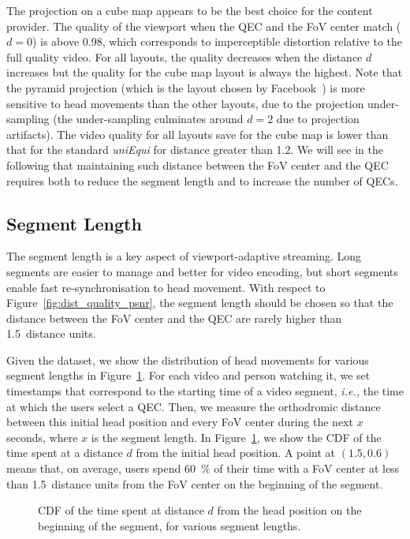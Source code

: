 The projection on a cube map appears to be the best choice for the
content provider. The quality of the viewport when the \ac{QEC} and
the \ac{FoV} center match ($d=0$) is above \num{0.98}, which
corresponds to imperceptible distortion relative to the full quality
video. For all layouts, the quality decreases when the distance $d$
increases but the quality for the cube map layout is always the
highest. Note that the pyramid projection (which is the layout chosen
by Facebook~\cite{facebook}) is more sensitive to head movements than
the other layouts, due to the projection under-sampling (the
under-sampling culminates around $d=2$ due to projection artifacts).
The video quality for all layouts save for the cube map is lower than
that for the standard \emph{uniEqui} for distance greater than
\num{1.2}. We will see in the following that maintaining such distance
between the \ac{FoV} center and the \ac{QEC} requires both to reduce
the segment length and to increase the number of \acp{QEC}.

\subsection{Segment Length}
\label{subsec:segmentLength}

The segment length is a key aspect of viewport-adaptive streaming.
Long segments are easier to manage and better for video encoding, but
short segments enable fast re-synchronisation to head movement. With
respect to Figure~\ref{fig:dist_quality_psnr}, the segment length
should be chosen so that the distance between the \ac{FoV} center and
the \ac{QEC} are rarely higher than \num{1.5}~distance units.

Given the dataset, we show the distribution of head movements for
various segment lengths in Figure~\ref{cdf-dataset}. For each video
and person watching it, we set timestamps that correspond to the
starting time of a video segment, \textit{i.e.,} the time at which the
users select a \ac{QEC}. Then, we measure the orthodromic distance
between this initial head position and every \ac{FoV} center during
the next $x$ seconds, where $x$ is the segment length. In
Figure~\ref{cdf-dataset}, we show the \ac{CDF} of the time spent at a
distance $d$ from the initial head position. A point at $(1.5,0.6)$
means that, on average, users spend \SI{60}{\percent} of their time
with a \ac{FoV} center at less than \num{1.5}~distance units from the
\ac{FoV} center on the beginning of the segment.

\begin{figure}[htbp]
\centering

\caption{CDF of the time spent at distance $d$ from the head position on the beginning of the
segment, for various segment lengths.}\label{cdf-dataset}
\end{figure}

